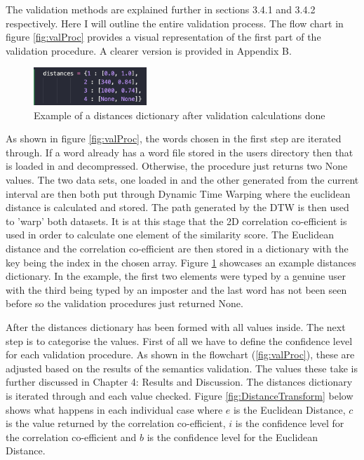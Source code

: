 \documentclass[10pt,a4paper]{report}
\begin{document}
The validation methods are explained further in sections 3.4.1 and 3.4.2 respectively. Here I will outline the entire validation process. The flow chart in figure \ref{fig:valProc} provides a visual representation of the first part of the validation procedure. A clearer version is provided in Appendix B.

\begin{figure}
	\begin{center}
		\includegraphics[width=0.38\textwidth]{DistancesDict}
	\end{center}
	\caption{Example of a distances dictionary after validation calculations done}
	\label{fig:distances}
\end{figure}

As shown in figure \ref{fig:valProc}, the words chosen in the first step are iterated through. If a word already has a word file stored in the users directory then that is loaded in and decompressed. Otherwise, the procedure just returns two None values. The two data sets, one loaded in and the other generated from the current interval are then both put through Dynamic Time Warping where the euclidean distance is calculated and stored. The path generated by the DTW is then used to 'warp' both datasets. It is at this stage that the 2D correlation co-efficient is used in order to calculate one element of the similarity score. The Euclidean distance and the correlation co-efficient are then stored in a dictionary with the key being the index in the chosen array. Figure \ref{fig:distances} showcases an example distances dictionary. In the example, the first two elements were typed by a genuine user with the third being typed by an imposter and the last word has not been seen before so the validation procedures just returned None.

After the distances dictionary has been formed with all values inside. The next step is to categorise the values. First of all we have to define the confidence level for each validation procedure. As shown in the flowchart (\ref{fig:valProc}), these are adjusted based on the results of the semantics validation. The values these take is further discussed in Chapter 4: Results and Discussion. The distances dictionary is iterated through and each value checked. Figure \ref{fig:DistanceTransform} below shows what happens in each individual case where \(e\) is the Euclidean Distance, \(c\) is the value returned by the correlation co-efficient, \(i\) is the confidence level for the correlation co-efficient and \(b\) is the confidence level for the Euclidean Distance.
\end{document}
